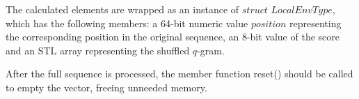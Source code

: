 The calculated elements are wrapped as an instance of $struct$ $LocalEnvType$, which has the following members: a 64-bit numeric value $position$ representing the corresponding position in the original sequence, an 8-bit value of the score and an STL array representing the shuffled $q$-gram.

After the full sequence is processed, the member function reset() should be called to empty the vector, freeing unneeded memory.